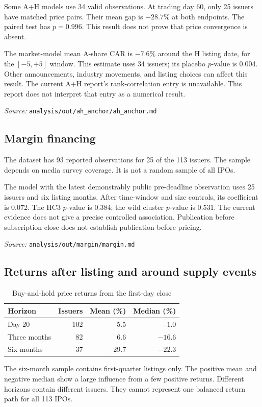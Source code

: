 \documentclass[11pt,a4paper]{article}
\newcommand{\src}[1]{\par{\footnotesize\textit{Source:} \nolinkurl{#1}}}
\begin{document}
Some A+H models use 34 valid observations.
At trading day 60, only 25 issuers have matched price pairs.
Their mean gap is $-28.7\%$ at both endpoints.
The paired test has $p=0.996$.
This result does not prove that price convergence is absent.

The market-model mean A-share CAR is $-7.6\%$ around the H listing date, for the $[-5,+5]$ window.
This estimate uses 34 issuers; its placebo $p$-value is 0.004.
Other announcements, industry movements, and listing choices can affect this result.
The current A+H report's rank-correlation entry is unavailable.
This report does not interpret that entry as a numerical result.
\src{analysis/out/ah_anchor/ah_anchor.md}

\subsection{Margin financing}
The dataset has 93 reported observations for 25 of the 113 issuers.
The sample depends on media survey coverage.
It is not a random sample of all IPOs.

The model with the latest demonstrably public pre-deadline observation uses 25 issuers and six listing months.
After time-window and size controls, its coefficient is 0.072.
The HC3 $p$-value is 0.384; the wild cluster $p$-value is 0.531.
The current evidence does not give a precise controlled association.
Publication before subscription close does not establish publication before pricing.
\src{analysis/out/margin/margin.md}

\subsection{Returns after listing and around supply events}
\begin{table}[h]
\centering
\caption{Buy-and-hold price returns from the first-day close}
\begin{tabular}{lrrr}
\toprule
Horizon & Issuers & Mean (\%) & Median (\%)\\
\midrule
Day 20 & 102 & 5.5 & $-1.0$\\
Three months & 82 & 6.6 & $-16.6$\\
Six months & 37 & 29.7 & $-22.3$\\
\bottomrule
\end{tabular}
\end{table}

The six-month sample contains first-quarter listings only.
The positive mean and negative median show a large influence from a few positive returns.
Different horizons contain different issuers.
They cannot represent one balanced return path for all 113 IPOs.
\end{document}
